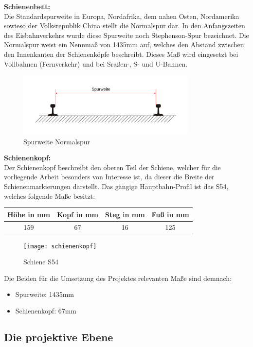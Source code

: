 \documentclass[11pt]{scrartcl}
\begin{document}
\noindent
\textbf{Schienenbett:}
\\

\noindent
Die Standardspurweite in Europa, Nordafrika, dem nahen Osten, Nordamerika sowieso der Volksrepublik China stellt die Normalspur dar. In den Anfangszeiten des Eisbahnverkehrs wurde diese Spurweite noch Stephenson-Spur bezeichnet. Die Normalspur weist ein Nennmaß von 1435mm auf, welches den Abstand zwischen den Innenkanten der Schienenköpfe beschreibt. Dieses Maß wird eingesetzt bei Vollbahnen (Fernverkehr) und bei Sraßen-, S- und U-Bahnen.
\begin{figure}[H]
  \includegraphics[width=0.8\textwidth]{spurweite}
  \caption{Spurweite Normalspur}
\end{figure}
\noindent
\textbf{Schienenkopf:}
\\

\noindent
Der Schienenkopf beschreibt den oberen Teil der Schiene, welcher für die vorliegende Arbeit besonders von Interesse ist, da dieser die Breite der Schienenmarkierungen darstellt. Das gängige Hauptbahn-Profil ist das S54, welches folgende Maße besitzt:
\\


\noindent
\begin{tabular}[h]{c|c|c|c}
Höhe in mm & Kopf in mm & Steg in mm & Fuß in mm\\
\hline
159 & 67 & 16 & 125 \\
\end{tabular}
\begin{figure}[H]
  \texttt{[image: schienenkopf]}
  \caption{Schiene S54}
\end{figure}
\noindent
Die Beiden für die Umsetzung des Projektes relevanten Maße sind demnach:
\begin{itemize}
	\item Spurweite: 1435mm
	\item Schienenkopf: 67mm
\end{itemize}

\subsection{Die projektive Ebene}
\label{sec:Die projektive Ebene}
\end{document}
